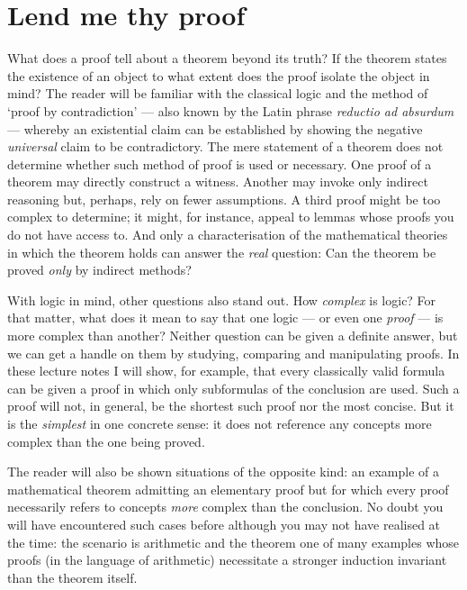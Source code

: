 %
\chapter{Lend me thy proof}
%

What does a proof tell about a theorem beyond its truth?
If the theorem states the existence of an object to what extent does the proof isolate the object in mind?
The reader will be familiar with the classical logic and the method of ‘proof by contradiction’ --- also known by the Latin phrase \emph{reductio ad absurdum} --- whereby an existential claim can be established by showing the negative \emph{universal} claim to be contradictory.
The mere statement of a theorem does not determine whether such method of proof is used or necessary.
One proof of a theorem may directly construct a witness.
Another may invoke only indirect reasoning but, perhaps, rely on fewer assumptions.
A third proof might be too complex to determine; it might, for instance, appeal to lemmas whose proofs you do not have access to.
And only a characterisation of the mathematical theories in which the theorem holds can answer the \emph{real} question: Can the theorem be proved \emph{only} by indirect methods?

With logic in mind, other questions also stand out.
How \emph{complex} is logic? 
For that matter, what does it mean to say that one logic --- or even one \emph{proof} --- is more complex than another?
Neither question can be given a definite answer, but we can get a handle on them by studying, comparing and manipulating proofs.
In these lecture notes
I will show, for example, that every classically valid formula can be given a proof in which only subformulas of the conclusion are used.
Such a proof will not, in general, be the shortest such proof nor the most concise.
But it is the \emph{simplest} in one concrete sense: it does not reference any concepts more complex than the one being proved.

The reader will also be shown situations of the opposite kind: an example of a mathematical theorem admitting an elementary proof but for which every proof necessarily refers to concepts \emph{more} complex than the conclusion.
No doubt you will have encountered such cases before although you may not have realised at the time: the scenario is arithmetic and the theorem one of many examples whose proofs (in the language of arithmetic) necessitate a stronger induction invariant than the theorem itself.

